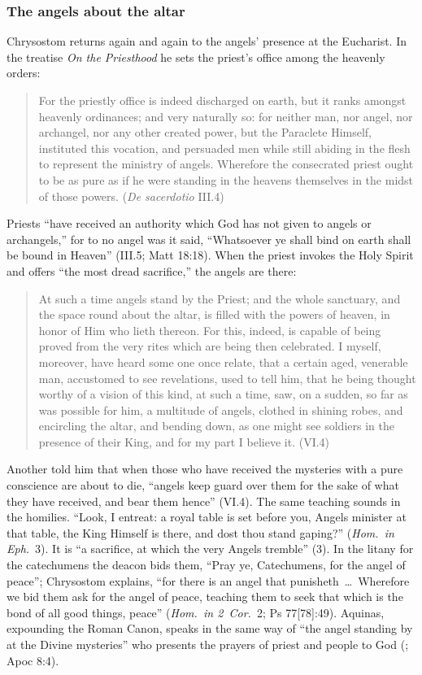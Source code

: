 \subsubsection{The angels about the altar}

Chrysostom returns again and again to the angels' presence at the
Eucharist. In the treatise \emph{On the Priesthood} he
sets the priest's office among the heavenly orders:

\begin{quote}
For the priestly office is indeed discharged on earth, but it ranks
amongst heavenly ordinances; and very naturally so: for neither man, nor
angel, nor archangel, nor any other created power, but the Paraclete
Himself, instituted this vocation, and persuaded men while still abiding
in the flesh to represent the ministry of angels. Wherefore the
consecrated priest ought to be as pure as if he were standing in the
heavens themselves in the midst of those powers. (\emph{De sacerdotio}
III.4)
\end{quote}

\noindent Priests ``have received an authority which God has not given
to angels or archangels,'' for to no angel was it said, ``Whatsoever ye
shall bind on earth shall be bound in Heaven'' (III.5; Matt 18:18). When
the priest invokes the Holy Spirit and offers ``the most dread
sacrifice,'' the angels are there:

\begin{quote}
At such a time angels stand by the Priest; and the whole sanctuary, and
the space round about the altar, is filled with the powers of heaven, in
honor of Him who lieth thereon. For this, indeed, is capable of being
proved from the very rites which are being then celebrated. I myself,
moreover, have heard some one once relate, that a certain aged, venerable
man, accustomed to see revelations, used to tell him, that he being
thought worthy of a vision of this kind, at such a time, saw, on a
sudden, so far as was possible for him, a multitude of angels, clothed in
shining robes, and encircling the altar, and bending down, as one might
see soldiers in the presence of their King, and for my part I believe it.
(VI.4)
\end{quote}

\noindent Another told him that when those who have received the
mysteries with a pure conscience are about to die, ``angels keep guard
over them for the sake of what they have received, and bear them hence''
(VI.4). The same teaching sounds in the homilies. ``Look, I entreat: a
royal table is set before you, Angels minister at that table, the King
Himself is there, and dost thou stand gaping?'' (\emph{Hom.\ in Eph.}\ 3).
It is ``a sacrifice, at which the very Angels tremble'' (3). In the litany
for the catechumens the deacon bids them, ``Pray ye, Catechumens, for the
angel of peace''; Chrysostom explains, ``for there is an angel that
punisheth~\dots\ Wherefore we bid them ask for the angel of peace, teaching
them to seek that which is the bond of all good things, peace'' (\emph{Hom.\
in 2~Cor.}\ 2; Ps 77[78]:49). Aquinas, expounding the Roman Canon, speaks
in the same way of ``the angel standing by at the Divine mysteries'' who
presents the prayers of priest and people to God (\ST{III q.~83 a.~4
ad~9}; Apoc 8:4).

